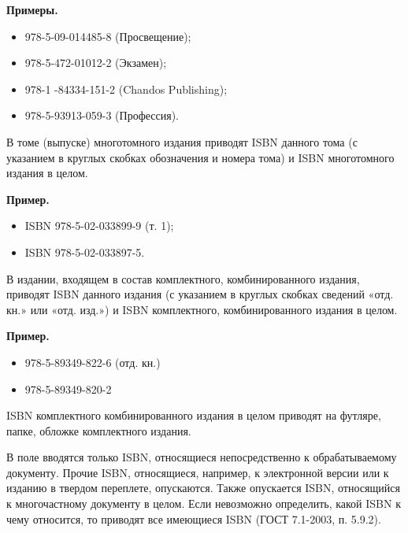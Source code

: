 \textbf{Примеры.}

\begin{itemize}
	\item 978-5-09-014485-8 (Просвещение);
	\item 978-5-472-01012-2 (Экзамен);
	\item 978-1 -84334-151-2 (Chandos Publishing);
	\item 978-5-93913-059-3 (Профессия).
\end{itemize}

В томе (выпуске) многотомного издания приводят ISBN данного тома (с указанием в круглых скобках обозначения и номера тома) и ISBN многотомного издания в целом.

\textbf{Пример.}

\begin{itemize}
	\item ISBN 978-5-02-033899-9 (т. 1);
	\item ISBN 978-5-02-033897-5.
\end{itemize}

В издании, входящем в состав комплектного, комбинированного издания, приводят ISBN данного издания (с указанием в круглых скобках сведений «отд. кн.» или «отд. изд.») и ISBN комплектного, комбинированного издания в целом.

\textbf{Пример.}

\begin{itemize}
	\item 978-5-89349-822-6 (отд. кн.)
	\item 978-5-89349-820-2
\end{itemize}

ISBN комплектного комбинированного издания в целом приводят на футляре, папке, обложке комплектного издания.

В поле вводятся только ISBN, относящиеся непосредственно к обрабатываемому документу. Прочие ISBN, относящиеся, например, к электронной версии или к изданию в твердом переплете, опускаются. Также опускается ISBN, относящийся к многочастному документу в целом.
Если невозможно определить, какой ISBN к чему относится, то приводят все имеющиеся ISBN (ГОСТ 7.1-2003, п. 5.9.2).
